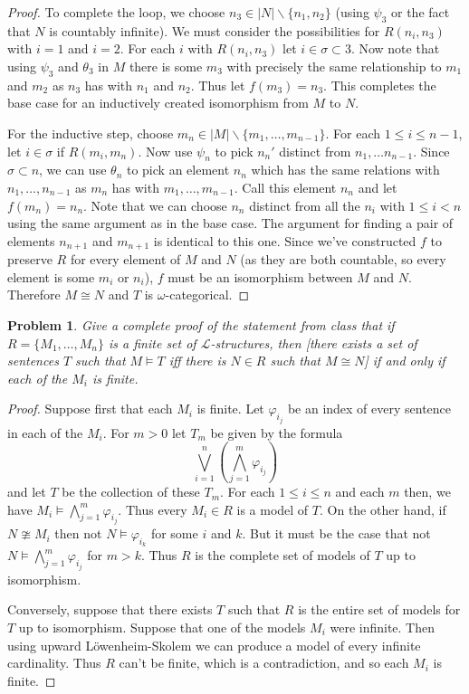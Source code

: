 \documentclass{article}
\newtheorem{problem}{Problem}
\begin{document}
\begin{proof}
To complete the loop, we choose $n_3 \in |N| \backslash \{n_1, n_2\}$ (using $\psi_3$ or the fact that $N$ is countably infinite). We must consider the possibilities for $R(n_i, n_3)$ with $i = 1$ and $i = 2$. For each $i$ with $R(n_i, n_3)$ let $i \in \sigma \subset 3$. Now note that using $\psi_3$ and $\theta_3$ in $M$ there is some $m_3$ with precisely the same relationship to $m_1$ and $m_2$ as $n_3$ has with $n_1$ and $n_2$. Thus let $f(m_3) = n_3$. This completes the base case for an inductively created isomorphism from $M$ to $N$.

For the inductive step, choose $m_n \in |M| \backslash \{m_1, \dots , m_{n-1}\}$. For each $1 \leq i \leq n-1$, let $i \in \sigma$ if $R(m_i, m_n)$. Now use $\psi_n$ to pick $n_n'$ distinct from $n_1, \dots n_{n-1}$. Since $\sigma \subset n$, we can use $\theta_{n}$ to pick an element $n_n$ which has the same relations with $n_1, \dots , n_{n-1}$ as $m_n$ has with $m_1, \dots , m_{n-1}$. Call this element $n_n$ and let $f(m_n) = n_n$. Note that we can choose $n_n$ distinct from all the $n_i$ with $1 \leq i < n$ using the same argument as in the base case. The argument for finding a pair of elements $n_{n+1}$ and $m_{n+1}$ is identical to this one. Since we've constructed $f$ to preserve $R$ for every element of $M$ and $N$ (as they are both countable, so every element is some $m_i$ or $n_i$), $f$ must be an isomorphism between $M$ and $N$. Therefore $M \cong N$ and $T$ is $\omega$-categorical.
\end{proof}

\begin{problem}
Give a complete proof of the statement from class that if $R = \{M_1, \dots , M_n\}$ is a finite set of $\mathcal{L}$-structures, then [there exists a set of sentences $T$ such that $M \models T$ iff there is $N \in R$ such that $M \cong N$] if and only if each of the $M_i$ is finite.
\end{problem}
\begin{proof}
Suppose first that each $M_i$ is finite. Let $\varphi_{i_j}$ be an index of every sentence in each of the $M_i$. For $m > 0$ let $T_m$ be given by the formula
\[
\bigvee_{i = 1}^{n} \left ( \bigwedge_{j=1}^{m} \varphi_{i_j} \right )
\]
and let $T$ be the collection of these $T_m$. For each $1 \leq i \leq n$ and each $m$ then, we have $M_i \models \bigwedge_{j=1}^{m} \varphi_{i_j}$. Thus every $M_i \in R$ is a model of $T$. On the other hand, if $N \ncong M_i$ then not $N \models \varphi_{i_k}$ for some $i$ and $k$. But it must be the case that not $N \models \bigwedge_{j=1}^{m} \varphi_{i_j}$ for $m > k$. Thus $R$ is the complete set of models of $T$ up to isomorphism.

Conversely, suppose that there exists $T$ such that $R$ is the entire set of models for $T$ up to isomorphism. Suppose that one of the models $M_i$ were infinite. Then using upward L\"{o}wenheim-Skolem we can produce a model of every infinite cardinality. Thus $R$ can't be finite, which is a contradiction, and so each $M_i$ is finite.
\end{proof}
\end{document}
